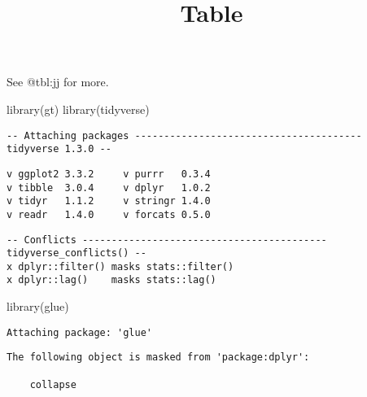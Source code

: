 \documentclass[
]{article}
\title{Table}
\author{}
\date{}
\newenvironment{Shaded}{}{}
\newcommand{\FunctionTok}[1]{\textcolor[rgb]{0.02,0.16,0.49}{#1}}
\newcommand{\NormalTok}[1]{#1}
\begin{document}
\maketitle

See @tbl:jj for more.

\begin{Shaded}
\begin{Highlighting}[]
\FunctionTok{library}\NormalTok{(gt)}
\FunctionTok{library}\NormalTok{(tidyverse)}
\end{Highlighting}
\end{Shaded}

\begin{verbatim}
-- Attaching packages --------------------------------------- tidyverse 1.3.0 --
\end{verbatim}

\begin{verbatim}
v ggplot2 3.3.2     v purrr   0.3.4
v tibble  3.0.4     v dplyr   1.0.2
v tidyr   1.1.2     v stringr 1.4.0
v readr   1.4.0     v forcats 0.5.0
\end{verbatim}

\begin{verbatim}
-- Conflicts ------------------------------------------ tidyverse_conflicts() --
x dplyr::filter() masks stats::filter()
x dplyr::lag()    masks stats::lag()
\end{verbatim}

\begin{Shaded}
\begin{Highlighting}[]
\FunctionTok{library}\NormalTok{(glue)}
\end{Highlighting}
\end{Shaded}

\begin{verbatim}
Attaching package: 'glue'
\end{verbatim}

\begin{verbatim}
The following object is masked from 'package:dplyr':

    collapse
\end{verbatim}
\end{document}
